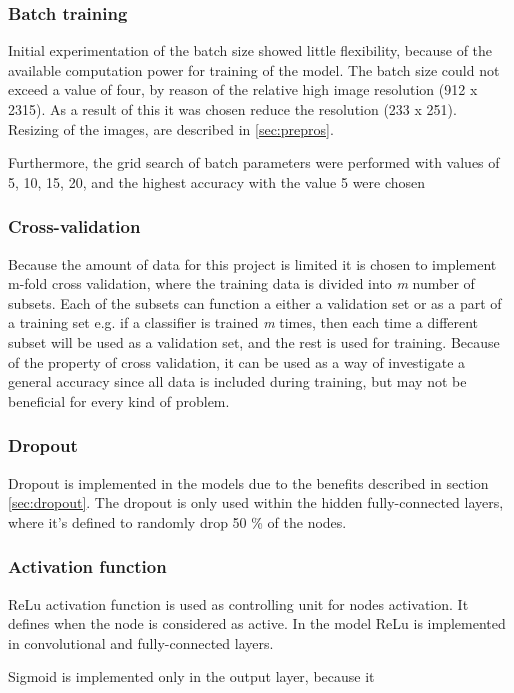 \subsubsection{Batch training}
Initial experimentation of the batch size showed little flexibility, because of the available computation power for training of the model. The batch size could not exceed a value of four, by reason of the relative high image resolution (912 x 2315). As a result of this it was chosen reduce the resolution (233 x 251). Resizing of the images, are described in \ref{sec:prepros}.

Furthermore, the grid search of batch parameters were performed with values of 5, 10, 15, 20, and the highest accuracy with the value 5 were chosen

\subsubsection{Cross-validation}
Because the amount of data for this project is limited it is chosen to implement m-fold cross validation, where the training data is divided into \textit{m} number of subsets. Each of the subsets can function a either a validation set or as a part of a training set e.g. if a classifier is trained \textit{m} times, then each time a different subset will be used as a validation set, and the rest is used for training. \citep{Duda2000}
Because of the property of cross validation, it can be used as a way of investigate a general accuracy since all data is included during training, but may not be beneficial for every kind of problem. \citep{Duda2000}

\subsubsection{Dropout}
Dropout is implemented in the models due to the benefits described in section \ref{sec:dropout}. The dropout is only used within the hidden fully-connected layers, where it’s defined to randomly drop 50 \% of the nodes.

\subsubsection{Activation function}
ReLu activation function is used as controlling unit for nodes activation. It defines when the node is considered as active. In the model ReLu is  implemented in convolutional and fully-connected layers.

Sigmoid is implemented only in the output layer, because it 

